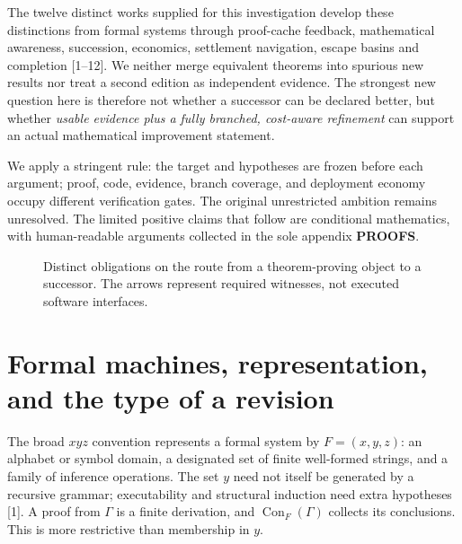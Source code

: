 \documentclass[11pt,letterpaper]{article}
\theoremstyle{definition}
\theoremstyle{remark}
\newcommand{\src}[1]{\textup{[#1]}}
\begin{document}
The twelve distinct works supplied for this investigation develop these distinctions from formal systems through proof-cache feedback, mathematical awareness, succession, economics, settlement navigation, escape basins and completion \src{1--12}. We neither merge equivalent theorems into spurious new results nor treat a second edition as independent evidence. The strongest new question here is therefore not whether a successor can be declared better, but whether \emph{usable evidence plus a fully branched, cost-aware refinement} can support an actual mathematical improvement statement.

We apply a stringent rule: the target and hypotheses are frozen before each argument; proof, code, evidence, branch coverage, and deployment economy occupy different verification gates. The original unrestricted ambition remains unresolved. The limited positive claims that follow are conditional mathematics, with human-readable arguments collected in the sole appendix \textbf{PROOFS}.

\begin{figure}[htbp]\centering
{}
\caption{Distinct obligations on the route from a theorem-proving object to a successor. The arrows represent required witnesses, not executed software interfaces.}\end{figure}

\section{Formal machines, representation, and the type of a revision}
The broad $xyz$ convention represents a formal system by $F=(x,y,z)$: an alphabet or symbol domain, a designated set of finite well-formed strings, and a family of inference operations. The set $y$ need not itself be generated by a recursive grammar; executability and structural induction need extra hypotheses \src{1}. A proof from $\Gamma$ is a finite derivation, and $\operatorname{Con}_F(\Gamma)$ collects its conclusions. This is more restrictive than membership in $y$.
\end{document}
